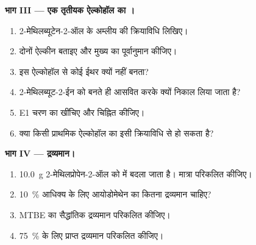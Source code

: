 \begin{problem}
\medskip
\noindent\textbf{भाग III --- एक तृतीयक ऐल्कोहॉल का ।}
\begin{enumerate}[resume]
  \item 2-मेथिलब्यूटेन-2-ऑल के अम्लीय  की
        क्रियाविधि लिखिए।
  \item दोनों ऐल्कीन बताइए और मुख्य का पूर्वानुमान कीजिए।
  \item इस ऐल्कोहॉल से कोई ईथर क्यों नहीं बनता?
  \item 2-मेथिलब्यूट-2-ईन को बनते ही आसवित करके क्यों निकाल लिया जाता है?
  \item E1 चरण का  खींचिए और
         चिह्नित कीजिए।
  \item क्या किसी प्राथमिक ऐल्कोहॉल का  इसी क्रियाविधि से हो सकता है?
\end{enumerate}

\medskip
\noindent\textbf{भाग IV --- द्रव्यमान।}
\begin{enumerate}[resume]
  \item \qty{10.0}{g} 2-मेथिलप्रोपेन-2-ऑल को
         में बदला जाता है। मात्रा परिकलित कीजिए।
  \item \qty{10}{\percent} आधिक्य के लिए आयोडोमेथेन का कितना द्रव्यमान चाहिए?
  \item MTBE का सैद्धांतिक द्रव्यमान परिकलित कीजिए।
  \item \qty{75}{\percent}  के लिए प्राप्त द्रव्यमान परिकलित कीजिए।
\end{enumerate}
\end{problem}
